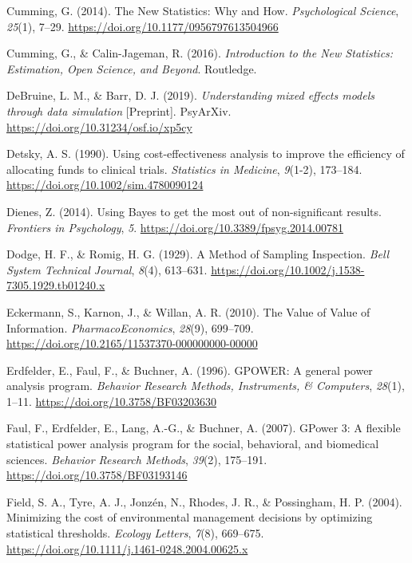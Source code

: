 \documentclass[
  english,
  ,jou, a4paper,floatsintext]{apa6}
\newlength{\cslhangindent}
\newenvironment{cslreferences}%
  {\setlength{\parindent}{0pt}%
  \everypar{\setlength{\hangindent}{\cslhangindent}}\ignorespaces}%
  {\par}
\begin{document}
\begin{cslreferences}
\leavevmode\hypertarget{ref-cumming_new_2014}{}%
Cumming, G. (2014). The New Statistics: Why and How. \emph{Psychological Science}, \emph{25}(1), 7--29. \url{https://doi.org/10.1177/0956797613504966}

\leavevmode\hypertarget{ref-cumming_introduction_2016}{}%
Cumming, G., \& Calin-Jageman, R. (2016). \emph{Introduction to the New Statistics: Estimation, Open Science, and Beyond}. Routledge.

\leavevmode\hypertarget{ref-debruine_understanding_2019}{}%
DeBruine, L. M., \& Barr, D. J. (2019). \emph{Understanding mixed effects models through data simulation} {[}Preprint{]}. PsyArXiv. \url{https://doi.org/10.31234/osf.io/xp5cy}

\leavevmode\hypertarget{ref-detsky_using_1990}{}%
Detsky, A. S. (1990). Using cost-effectiveness analysis to improve the efficiency of allocating funds to clinical trials. \emph{Statistics in Medicine}, \emph{9}(1-2), 173--184. \url{https://doi.org/10.1002/sim.4780090124}

\leavevmode\hypertarget{ref-dienes_using_2014}{}%
Dienes, Z. (2014). Using Bayes to get the most out of non-significant results. \emph{Frontiers in Psychology}, \emph{5}. \url{https://doi.org/10.3389/fpsyg.2014.00781}

\leavevmode\hypertarget{ref-dodge_method_1929}{}%
Dodge, H. F., \& Romig, H. G. (1929). A Method of Sampling Inspection. \emph{Bell System Technical Journal}, \emph{8}(4), 613--631. \url{https://doi.org/10.1002/j.1538-7305.1929.tb01240.x}

\leavevmode\hypertarget{ref-eckermann_value_2010}{}%
Eckermann, S., Karnon, J., \& Willan, A. R. (2010). The Value of Value of Information. \emph{PharmacoEconomics}, \emph{28}(9), 699--709. \url{https://doi.org/10.2165/11537370-000000000-00000}

\leavevmode\hypertarget{ref-erdfelder_gpower_1996}{}%
Erdfelder, E., Faul, F., \& Buchner, A. (1996). GPOWER: A general power analysis program. \emph{Behavior Research Methods, Instruments, \& Computers}, \emph{28}(1), 1--11. \url{https://doi.org/10.3758/BF03203630}

\leavevmode\hypertarget{ref-faul_gpower_2007}{}%
Faul, F., Erdfelder, E., Lang, A.-G., \& Buchner, A. (2007). GPower 3: A flexible statistical power analysis program for the social, behavioral, and biomedical sciences. \emph{Behavior Research Methods}, \emph{39}(2), 175--191. \url{https://doi.org/10.3758/BF03193146}

\leavevmode\hypertarget{ref-field_minimizing_2004}{}%
Field, S. A., Tyre, A. J., Jonzén, N., Rhodes, J. R., \& Possingham, H. P. (2004). Minimizing the cost of environmental management decisions by optimizing statistical thresholds. \emph{Ecology Letters}, \emph{7}(8), 669--675. \url{https://doi.org/10.1111/j.1461-0248.2004.00625.x}


\end{cslreferences}
\end{document}
